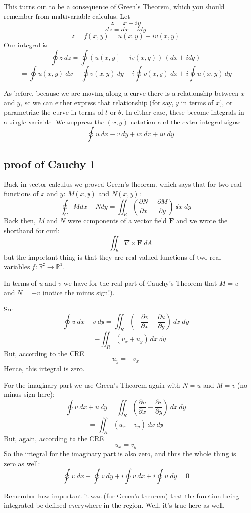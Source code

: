 \documentclass[11pt, oneside]{article}
\begin{document}
This turns out to be a consequence of Green's Theorem, which you should remember from multivariable calculus.  Let
\[ z = x + i y \]
\[ dz = dx + i dy \]
\[ z = f(x,y) = u(x,y) + iv(x,y) \]
Our integral is
\[ \oint z \ dz = \oint (u(x,y) + iv(x,y)) \ (dx + i dy) \]
\[ =  \oint u(x,y) \ dx - \oint v(x,y) \ dy + i \oint v(x,y) \ dx + i \oint u(x,y) \ dy \]

As before, because we are moving along a curve there is a relationship between $x$ and $y$, so we can either express that relationship (for say, $y$ in terms of $x$), or parametrize the curve in terms of $t$ or $\theta$.  In either case, these become integrals in a single variable.  We suppress the $(x,y)$ notation and the extra integral signs:
\[ =  \oint u \ dx - v \ dy + i v \ dx + i u \ dy \]

\subsection*{proof of Cauchy 1}
Back in vector calculus we proved Green's theorem, which says that for two real functions of $x$ and $y$:  $M(x,y)$ and $N(x,y)$:
\[ \oint_C M dx + N dy = \iint_R (\frac{\partial N}{\partial x} - \frac{\partial M}{\partial y}) \ dx \ dy \]
Back then, $M$ and $N$ were components of a vector field $\mathbf{F}$ and we wrote the shorthand for curl:
\[ = \iint_R \nabla \times \mathbf{F} \ dA\]
but the important thing is that they are real-valued functions of two real variables $f: \mathbb{R}^2 \rightarrow \mathbb{R}^1$.

In terms of $u$ and $v$ we have for the real part of Cauchy's Theorem that $M=u$ and $N = -v$ (notice the minus sign!).  

So:
\[ \oint u \ dx - v \ dy = \iint_R (-\frac{\partial v}{\partial x} -  \frac{\partial u}{\partial y}) \ dx \ dy \]
\[ = - \iint_R (v_x + u_y) \ dx \ dy \]
But, according to the CRE
\[ u_y = -v_x \]
Hence, this integral is zero.

For the imaginary part we use Green's Theorem again with $N=u$ and $M = v$ (no minus sign here):
\[ \oint v \ dx + u \ dy =  \iint_R (\frac{\partial u}{\partial x} - \frac{\partial v}{\partial y}) \ dx \ dy \]
\[ =  \iint_R (u_x - v_y) \ dx \ dy \]
But, again, according to the CRE
\[ u_x = v_y \]
So the integral for the imaginary part is also zero, and thus the whole thing is zero as well:
\[ \oint u \ dx - \oint v \ dy + i \oint v \ dx + i \oint u \ dy = 0 \]

Remember how important it was (for Green's theorem) that the function being integrated be defined everywhere in the region.  Well, it's true here as well.
\end{document}
